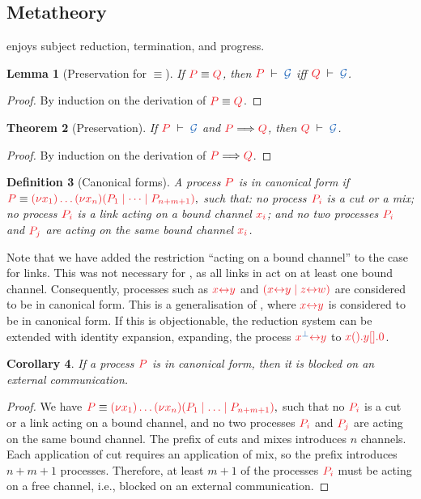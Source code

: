 \documentclass[submission,copyright,creativecommons]{eptcs}
\newtheorem{lemma}{Lemma}[section]
\newtheorem{theorem}[lemma]{Theorem}
\newtheorem{corollary}[lemma]{Corollary}
\newtheorem{definition}[lemma]{Definition}
\begin{document}
\subsection{Metatheory}
\hcp enjoys subject reduction, termination, and progress.
\begin{lemma}[Preservation for $\equiv$]\label{lem:hcp-preservation-equiv}
  If $\tm{P}\equiv\tm{Q}$, then $\seq[P]{\mathcal{G}}$ iff $\seq[Q]{\mathcal{G}}$.
\end{lemma} 
\begin{proof}
  By induction on the derivation of $\tm{P}\equiv\tm{Q}$.
\end{proof}
\begin{theorem}[Preservation]\label{thm:hcp-preservation}
  If $\seq[P]{\mathcal{G}}$ and $\reducesto{P}{Q}$, then $\seq[Q]{\mathcal{G}}$.
\end{theorem} 
\begin{proof}
  By induction on the derivation of $\reducesto{P}{Q}$.
\end{proof}
\begin{definition}[Canonical forms]
  A process $\tm{P}$ is in canonical form if
  \(
  \tm{P} \equiv \tm{\piNew{x_1}{\dots\piNew{x_n}{(P_1 \mid \dots \mid P_{n+m+1})}}},
  \)
  such that: no process $\tm{P_i}$ is a cut or a mix; no process $\tm{P_i}$ is a link acting on a bound channel $\tm{x_i}$; and no two processes $\tm{P_i}$ and $\tm{P_j}$ are acting on the same bound channel $\tm{x_i}$.
\end{definition}
Note that we have added the restriction ``acting on a bound channel'' to the case for links. This was not necessary for \cp, as all links in \cp act on at least one bound channel. Consequently, processes such as $\tm{\cpLink{x}{y}}$ and $\tm{(\piPar{\cpLink{x}{y}}{\cpLink{z}{w}})}$ are considered to be in canonical form. This is a generalisation of \cp, where $\tm{\cpLink{x}{y}}$ is considered to be in canonical form. If this is objectionable, the reduction system can be extended with identity expansion, expanding, \eg the process $\tm{\cpLink{x^{\ty{\bot}}}{y}}$ to $\tm{\cpWait{x}{\cpHalt{y}}}$.
\begin{corollary}
  If a process $\tm{P}$ is in canonical form, then it is blocked on an external communication.
\end{corollary}
\begin{proof}
  We have
  \(
  \tm{P} \equiv \tm{\piNew{x_1}{\dots\piNew{x_n}{(P_1 \ppar \dots \ppar P_{n+m+1})}}},
  \)
  such that no $\tm{P_i}$ is a cut or a link acting on a bound channel, and no two processes $\tm{P_i}$ and $\tm{P_j}$ are acting on the same bound channel. The prefix of cuts and mixes introduces $n$ channels. Each application of cut requires an application of mix, so the prefix introduces $n+m+1$ processes. Therefore, at least $m+1$ of the processes $\tm{P_i}$ must be acting on a free channel, i.e., blocked on an external communication.
\end{proof}
\end{document}
